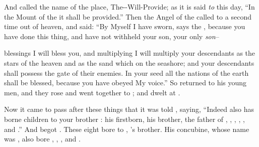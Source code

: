 \bverse And \Abraham called the name of the place, The-\lord-Will-Provide; as it is said \textit{to} this day, ``In the Mount of the \lord it shall be provided.''
\bverse Then the Angel of the \lord called to \Abraham a second time out of heaven,
\bverse and said: ``By Myself I have sworn, says the \lord, because you have done this thing, and have not withheld your son, your only \textit{son}--

\bverse blessings I will bless you, and multiplying I will multiply your descendants as the stars of the heaven and as the sand which \is on the seashore; and your descendants shall possess the gate of their enemies.
\bverse In your seed all the nations of the earth shall be blessed, because you have obeyed My voice.''
\bverse So \Abraham returned to his young men, and they rose and went together to \Beersheba; and \Abraham dwelt at \Beersheba.


\bverse Now it came to pass after these things that it was told \Abraham, saying, ``Indeed  also has borne children to your brother :
\bverse {} his firstborn,  his brother,  the father of ,
\bverse {}, , , , and .''
\bverse And  begot . These eight  bore to , \Abraham's brother.
\bverse His concubine, whose name was , also bore , , , and .
